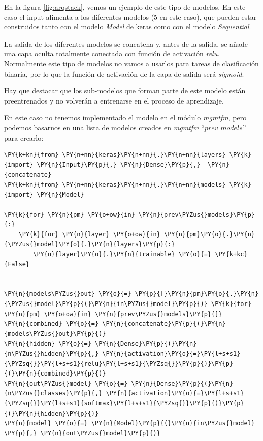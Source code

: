 En la figura \ref{fig:arqstack}, vemos un ejemplo de este tipo de modelos. En este caso el input alimenta a los diferentes modelos (5 en este caso), que pueden estar construidos tanto con el modelo \textit{Model} de keras como con el modelo \textit{Sequential}.


La salida de los diferentes modelos se concatena y, antes de la salida, se añade una capa oculta totalmente conectada con función de activación \textit{relu}. Normalmente este tipo de modelos no vamos a usarlos para tareas de clasificación binaria, por lo que la función de activación de la capa de salida será \textit{sigmoid}.


Hay que destacar que los sub-modelos que forman parte de este modelo están preentrenados y no volverán a entrenarse en el proceso de aprendizaje.


En este caso no tenemos implementado el modelo en el módulo \textit{mgmtfm}, pero podemos basarnos en una lista de modelos creados en \textit{mgmtfm} ``$prev\_models$'' para crearlo: 
\vspace{0.5cm}

    \begin{tcolorbox}[breakable, size=fbox, boxrule=1pt, pad at break*=1mm,colback=cellbackground, colframe=cellborder]
\begin{Verbatim}[commandchars=\\\{\}]
\PY{k+kn}{from} \PY{n+nn}{keras}\PY{n+nn}{.}\PY{n+nn}{layers} \PY{k}{import} \PY{n}{Input}\PY{p}{,} \PY{n}{Dense}\PY{p}{,}  \PY{n}{concatenate}
\PY{k+kn}{from} \PY{n+nn}{keras}\PY{n+nn}{.}\PY{n+nn}{models} \PY{k}{import} \PY{n}{Model}

\PY{k}{for} \PY{n}{pm} \PY{o+ow}{in} \PY{n}{prev\PYZus{}models}\PY{p}{:}
    \PY{k}{for} \PY{n}{layer} \PY{o+ow}{in} \PY{n}{pm}\PY{o}{.}\PY{n}{\PYZus{}model}\PY{o}{.}\PY{n}{layers}\PY{p}{:}
        \PY{n}{layer}\PY{o}{.}\PY{n}{trainable} \PY{o}{=} \PY{k+kc}{False}


\PY{n}{models\PYZus{}out} \PY{o}{=} \PY{p}{[}\PY{n}{pm}\PY{o}{.}\PY{n}{\PYZus{}model}\PY{p}{(}\PY{n}{in\PYZus{}model}\PY{p}{)} \PY{k}{for} \PY{n}{pm} \PY{o+ow}{in} \PY{n}{prev\PYZus{}models}\PY{p}{]}
\PY{n}{combined} \PY{o}{=} \PY{n}{concatenate}\PY{p}{(}\PY{n}{models\PYZus{}out}\PY{p}{)}
\PY{n}{hidden} \PY{o}{=} \PY{n}{Dense}\PY{p}{(}\PY{n}{n\PYZus{}hidden}\PY{p}{,} \PY{n}{activation}\PY{o}{=}\PY{l+s+s1}{\PYZsq{}}\PY{l+s+s1}{relu}\PY{l+s+s1}{\PYZsq{}}\PY{p}{)}\PY{p}{(}\PY{n}{combined}\PY{p}{)}
\PY{n}{out\PYZus{}model} \PY{o}{=} \PY{n}{Dense}\PY{p}{(}\PY{n}{n\PYZus{}classes}\PY{p}{,} \PY{n}{activation}\PY{o}{=}\PY{l+s+s1}{\PYZsq{}}\PY{l+s+s1}{softmax}\PY{l+s+s1}{\PYZsq{}}\PY{p}{)}\PY{p}{(}\PY{n}{hidden}\PY{p}{)}
\PY{n}{model} \PY{o}{=} \PY{n}{Model}\PY{p}{(}\PY{n}{in\PYZus{}model} \PY{p}{,} \PY{n}{out\PYZus{}model}\PY{p}{)}
\end{Verbatim}
\end{tcolorbox}

